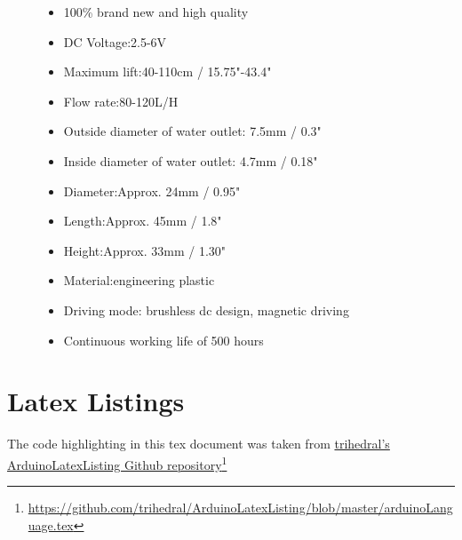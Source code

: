 \documentclass[a4paper,12pt,oneside,openright,titlepage]{book}
\newcommand\citeurl[2]{%
  \href{#1}{#2}\footnote{\url{#1}}%
}
\begin{document}
\begin{figure}[ht]
	\begin{itemize}
	\item 100\% brand new and high quality
	\item DC Voltage:2.5-6V
	\item Maximum lift:40-110cm / 15.75"-43.4"
	\item Flow rate:80-120L/H
	\item Outside diameter of water outlet: 7.5mm / 0.3"
	\item Inside diameter of water outlet: 4.7mm / 0.18"
	\item Diameter:Approx. 24mm / 0.95"
	\item Length:Approx. 45mm / 1.8"
	\item Height:Approx. 33mm / 1.30"
	\item Material:engineering plastic
	\item Driving mode: brushless dc design, magnetic driving
	\item Continuous working life of 500 hours
	\end{itemize}
	\label{fig:pump description}
\end{figure}



\chapter{Latex Listings}
The code highlighting in this tex document was taken from \citeurl{https://github.com/trihedral/ArduinoLatexListing/blob/master/arduinoLanguage.tex}{trihedral's ArduinoLatexListing Github repository}
\end{document}

